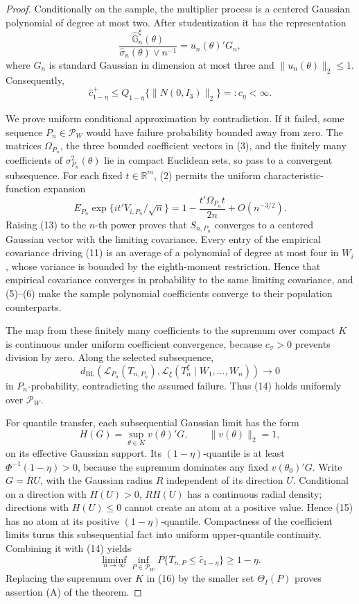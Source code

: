 \documentclass{article}
\begin{document}
\begin{proof}
Conditionally on the sample, the multiplier process is a centered Gaussian polynomial of degree at most two. After studentization it has the representation
\[
 \frac{\widehat{\mathbb G}_n^\xi(\theta)}
      {\widehat\sigma_n(\theta)\vee n^{-1}}
 =u_n(\theta)'G_n, \tag{11}
\]
where \(G_n\) is standard Gaussian in dimension at most three and \(\|u_n(\theta)\|_2\leq1\). Consequently,
\[
 \widehat c_{1-\eta}^+
 \leq Q_{1-\eta}\{\|N(0,I_3)\|_2\}=:c_\eta<\infty. \tag{12}
\]

We prove uniform conditional approximation by contradiction. If it failed, some sequence \(P_n\in\mathcal P_W\) would have failure probability bounded away from zero. The matrices \(\Omega_{P_n}\), the three bounded coefficient vectors in (3), and the finitely many coefficients of \(\sigma_{P_n}^2(\theta)\) lie in compact Euclidean sets, so pass to a convergent subsequence. For each fixed \(t\in\mathbb R^m\), (2) permits the uniform characteristic-function expansion
\[
 E_{P_n}\exp\{it'V_{i,P_n}/\sqrt n\}
 =1-\frac{t'\Omega_{P_n}t}{2n}+O(n^{-3/2}). \tag{13}
\]
Raising (13) to the \(n\)-th power proves that \(S_{n,P_n}\) converges to a centered Gaussian vector with the limiting covariance. Every entry of the empirical covariance driving (11) is an average of a polynomial of degree at most four in \(W_i\), whose variance is bounded by the eighth-moment restriction. Hence that empirical covariance converges in probability to the same limiting covariance, and (5)--(6) make the sample polynomial coefficients converge to their population counterparts.

The map from these finitely many coefficients to the supremum over compact \(K\) is continuous under uniform coefficient convergence, because \(c_\sigma>0\) prevents division by zero. Along the selected subsequence,
\[
 d_{\mathrm{BL}}\!\left(
 \mathcal L_{P_n}(T_{n,P_n}),
 \mathcal L_\xi(T_n^\xi\mid W_1,\ldots,W_n)
 \right)\longrightarrow0 \tag{14}
\]
in \(P_n\)-probability, contradicting the assumed failure. Thus (14) holds uniformly over \(\mathcal P_W\).

For quantile transfer, each subsequential Gaussian limit has the form
\[
 H(G)=\sup_{\theta\in K}v(\theta)'G,
 \qquad \|v(\theta)\|_2=1, \tag{15}
\]
on its effective Gaussian support. Its \((1-\eta)\)-quantile is at least \(\Phi^{-1}(1-\eta)>0\), because the supremum dominates any fixed \(v(\theta_0)'G\). Write \(G=RU\), with the Gaussian radius \(R\) independent of its direction \(U\). Conditional on a direction with \(H(U)>0\), \(RH(U)\) has a continuous radial density; directions with \(H(U)\leq0\) cannot create an atom at a positive value. Hence (15) has no atom at its positive \((1-\eta)\)-quantile. Compactness of the coefficient limits turns this subsequential fact into uniform upper-quantile continuity. Combining it with (14) yields
\[
 \liminf_{n\to\infty}\inf_{P\in\mathcal P_W}
 P\{T_{n,P}\leq\widehat c_{1-\eta}\}\geq1-\eta. \tag{16}
\]
Replacing the supremum over \(K\) in (16) by the smaller set \(\Theta_I(P)\) proves assertion (A) of the theorem.


\end{proof}
\end{document}
